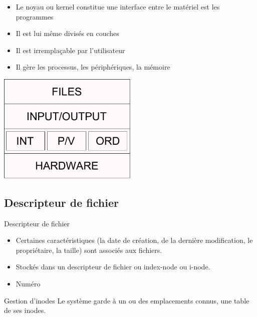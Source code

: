 \begin{frame}{\sectitle}
\begin{block}{\subsectitle}
\begin{itemize}
\item Le noyau ou kernel constitue une interface entre le matériel est les programmes
\item Il est lui même divisés en couches 
\item Il est irremplaçable par l'utilisateur
\item Il gère les processus, les périphériques, la mémoire
\end{itemize}
\end{block}

\begin{center}
\includegraphics[width=0.50\textwidth]{images/NoyauCouches.pdf}
\end{center}

\end{frame}

\def\subsectitle{Descripteur de fichier}
\subsection{\subsectitle}
\begin{frame}{\sectitle}
	\begin{block}{\subsectitle}

		\begin{itemize}
		\item Certaines caractéristiques (la date de  création, de la dernière
modification, le  propriétaire, la  taille) sont associés aux fichiers.
		\item Stockés dans un descripteur de fichier ou index-node ou i-node.
		\item Numéro 
		\end{itemize}
	\end{block}

	\begin{alertblock}{Gestion d'inodes}
	Le système garde à un ou des emplacements connus, une table de ses inodes.
	\end{alertblock}

\end{frame}

